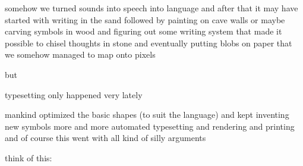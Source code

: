 \enablemode[print]


\definecolor[maincolor] [s=.6]
\definecolor[othercolor][s=.2]


\startdocument
  [title={How about those\\typographic virtues:\\do they still make sense?},
   subtitle={Hans Hagen\\EuroBacho\TeX\\May 2013}]

\StartSteps

\starttopic[title=Typesetting]

    \FlushStep

    \startitemize
        \startitem somehow we turned sounds into speech into language \FlushStep \stopitem
        \startitem and after that it may have started with writing in the sand \FlushStep \stopitem
        \startitem followed by painting on cave walls \FlushStep \stopitem
        \startitem or maybe carving symbols in wood \FlushStep \stopitem
        \startitem and figuring out some writing system \FlushStep \stopitem
        \startitem that made it possible to chisel thoughts in stone \FlushStep \stopitem
        \startitem and eventually putting blobs on paper \FlushStep \stopitem
        \startitem that we somehow managed to map onto pixels \FlushStep \stopitem
    \stopitemize

    but \FlushStep

    \startitemize
        \startitem typesetting only happened very lately \FlushStep \stopitem
    \stopitemize

\stoptopic

\StopSteps

\StartSteps

\starttopic[title=In the process]

    \FlushStep

    \startitemize
        \startitem mankind optimized the basic shapes (to suit the language) \FlushStep \stopitem
        \startitem and kept inventing new symbols \FlushStep \stopitem
        \startitem more and more automated typesetting and rendering and printing \FlushStep \stopitem
        \startitem and of course this went with all kind of silly arguments \FlushStep \stopitem
    \stopitemize

    think of this: \FlushStep

